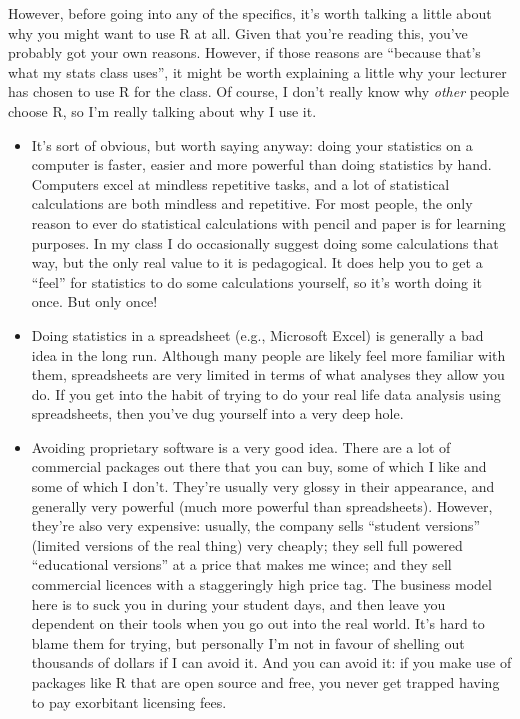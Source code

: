 \documentclass[
]{book}
\providecommand{\tightlist}{%
  \setlength{\itemsep}{0pt}\setlength{\parskip}{0pt}}
\begin{document}
However, before going into any of the specifics, it's worth talking a little about why you might want to use R at all. Given that you're reading this, you've probably got your own reasons. However, if those reasons are ``because that's what my stats class uses'', it might be worth explaining a little why your lecturer has chosen to use R for the class. Of course, I don't really know why \emph{other} people choose R, so I'm really talking about why I use it.

\begin{itemize}
\tightlist
\item
  It's sort of obvious, but worth saying anyway: doing your statistics on a computer is faster, easier and more powerful than doing statistics by hand. Computers excel at mindless repetitive tasks, and a lot of statistical calculations are both mindless and repetitive. For most people, the only reason to ever do statistical calculations with pencil and paper is for learning purposes. In my class I do occasionally suggest doing some calculations that way, but the only real value to it is pedagogical. It does help you to get a ``feel'' for statistics to do some calculations yourself, so it's worth doing it once. But only once!
\item
  Doing statistics in a spreadsheet (e.g., Microsoft Excel) is generally a bad idea in the long run. Although many people are likely feel more familiar with them, spreadsheets are very limited in terms of what analyses they allow you do. If you get into the habit of trying to do your real life data analysis using spreadsheets, then you've dug yourself into a very deep hole.
\item
  Avoiding proprietary software is a very good idea. There are a lot of commercial packages out there that you can buy, some of which I like and some of which I don't. They're usually very glossy in their appearance, and generally very powerful (much more powerful than spreadsheets). However, they're also very expensive: usually, the company sells ``student versions'' (limited versions of the real thing) very cheaply; they sell full powered ``educational versions'' at a price that makes me wince; and they sell commercial licences with a staggeringly high price tag. The business model here is to suck you in during your student days, and then leave you dependent on their tools when you go out into the real world. It's hard to blame them for trying, but personally I'm not in favour of shelling out thousands of dollars if I can avoid it. And you can avoid it: if you make use of packages like R that are open source and free, you never get trapped having to pay exorbitant licensing fees.

\end{itemize}
\end{document}
